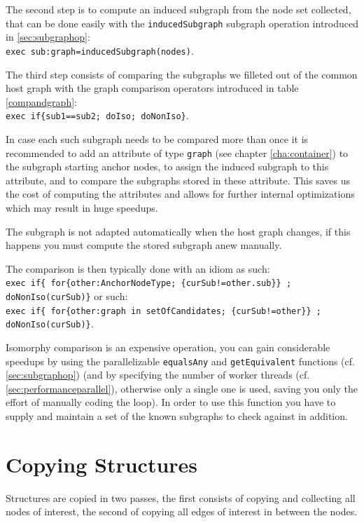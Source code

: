The second step is to compute an induced subgraph from the node set collected, that can be done easily with the \texttt{inducedSubgraph} subgraph operation introduced in \ref{sec:subgraphop}:\\ \verb#exec sub:graph=inducedSubgraph(nodes)#.

The third step consists of comparing the subgraphs we filleted out of the common host graph with the graph comparison operators introduced in table \ref{compandgraph}:\\
\verb#exec if{sub1==sub2; doIso; doNonIso}#.

In case each such subgraph needs to be compared more than once it is recommended to add an attribute of type \texttt{graph} (see chapter \ref{cha:container}) to the subgraph starting anchor nodes, to assign the induced subgraph to this attribute, and to compare the subgraphs stored in these attribute.
This saves us the cost of computing the attributes and allows for further internal optimizations which 
may result in huge speedups.

\begin{warning}
The subgraph is not adapted automatically when the host graph changes, if this happens you must compute the stored subgraph anew manually.
\end{warning}

\noindent The comparison is then typically done with an idiom as such:\\
\verb#exec if{ for{other:AnchorNodeType; {curSub!=other.sub}} ; doNonIso(curSub)}# 
or such:\\
\verb#exec if{ for{other:graph in setOfCandidates; {curSub!=other}} ; doNonIso(curSub)}#.

Isomorphy comparison is an expensive operation, you can gain considerable speedups by using the parallelizable \texttt{equalsAny} and \texttt{getEquivalent} functions (cf. \ref{sec:subgraphop}) (and by specifying the number of worker threads (cf. \ref{sec:performanceparallel}), otherwise only a single one is used, saving you only the effort of manually coding the loop). 
In order to use this function you have to supply and maintain a set of the known subgraphs to check against in addition. 

\section{Copying Structures}\label{subsub:copystructure}
Structures are copied in two passes, the first consists of copying and collecting all nodes of interest, the second of copying all edges of interest in between the nodes.

